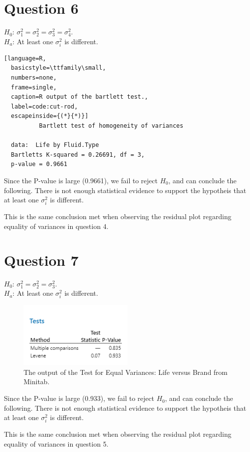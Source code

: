 \documentclass{article}
\begin{document}
\section*{Question 6}
\begin{flushleft}
  $H_0$: $\sigma_1^2 = \sigma_2^2 = \sigma_3^2 = \sigma_4^2$. \\
  $H_a$: At least one $\sigma_i^2$ is different. \\
  \end{flushleft}
\begin{lstlisting}[language=R, 
  basicstyle=\ttfamily\small,
  numbers=none, 
  frame=single, 
  caption=R output of the bartlett test.,
  label=code:cut-rod,
  escapeinside={(*}{*)}]
	      Bartlett test of homogeneity of variances

  data:  Life by Fluid.Type
  Bartletts K-squared = 0.26691, df = 3,
  p-value = 0.9661
\end{lstlisting}
Since the P-value is large (0.9661), we fail to reject $H_0$, and can conclude the following.
There is not enough statistical evidence to support the hypotheis that at least one $\sigma_i^2$ is different.

This is the same conclusion met when observing the residual plot regarding equality of variances in question 4.

\section*{Question 7}
\begin{flushleft}
  $H_0$: $\sigma_1^2 = \sigma_2^2 = \sigma_3^2$. \\
  $H_a$: At least one $\sigma_i^2$ is different. \\
  \end{flushleft}
  \begin{figure}[h]
    \centering
    \includegraphics[width=0.5\textwidth]{./images/7.png}
    \caption{The output of the Test for Equal Variances: Life versus Brand from Minitab.}
    \label{fig:7}
\end{figure}
Since the P-value is large (0.933), we fail to reject $H_0$, and can conclude the following.
There is not enough statistical evidence to support the hypotheis that at least one $\sigma_i^2$ is different.

This is the same conclusion met when observing the residual plot regarding equality of variances in question 5.
\end{document}
